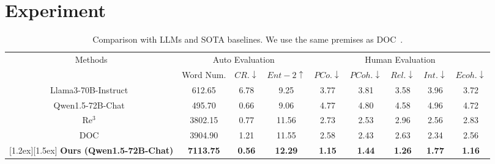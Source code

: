 
\section{Experiment}
\label{experiment}



\begin{table}
\small
    \centering
    \renewcommand{\tabcolsep}{3.0pt}
    \renewcommand{\arraystretch}{1.0}
    \begin{tabular}{ccccccccc}
    \hline
        \multirow{2}{*}{Methods} & \multicolumn{3}{c}{Auto Evaluation} & \multicolumn{5}{c}{Human Evaluation} \\
        \cmidrule[\cmidrulewidth](r{0.5em}){2-4}  \cmidrule[\cmidrulewidth](r{0.5em}){5-9}
        & Word Num. & $CR.\downarrow$  & ${Ent-2}\uparrow$ &$PCo.\downarrow$ &$PCoh.\downarrow$ &$Rel.\downarrow$ & $Int.\downarrow$ &$Ecoh.\downarrow$ \\
        
        \hline
        Llama3-70B-Instruct~\cite{llama3} &612.65  &6.78   &9.25 &3.77  &3.81  &3.58  &3.96  &3.72  \\
        Qwen1.5-72B-Chat~\cite{bai2023qwen} &495.70   &0.66  &9.06 &4.77  &4.80  &4.58  &4.96  &4.72   \\
        \hline
        Re$^3$~\cite{Re3} &3802.15 &0.77 &11.56 &2.73  &2.53  &2.96  &2.56  &2.83    \\
        DOC~\cite{DOC} &3904.90  &1.21 &11.55 &2.58  &2.43  &2.63  &2.34  &2.56  \\
        \rowcolor{mycyan}[1.2ex][1.5ex] \textbf{Ours (Qwen1.5-72B-Chat)} &\textbf{7113.75} &\textbf{0.56} &\textbf{12.29} &\textbf{1.15}  &\textbf{1.44}  &\textbf{1.26}  &\textbf{1.77} & \textbf{1.16}  \\
        \hline
    \end{tabular}
    \caption{Comparison with LLMs and SOTA baselines. We use the same premises as DOC~\citet{DOC}.}
    \label{tab:human_eval}
\end{table}


